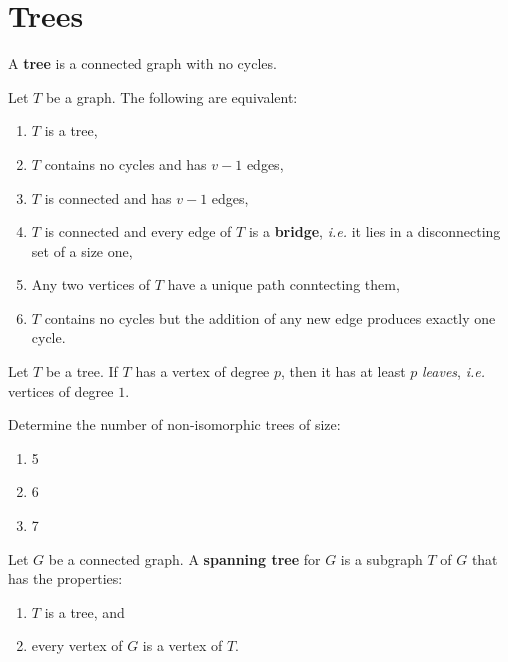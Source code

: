 \section{Trees}\label{sec:trees}

\begin{definition} A \textbf{tree} is a connected graph with no cycles.
\end{definition}

\begin{theorem} Let $T$ be a graph.  The following are equivalent:
\begin{enumerate}
    \item $T$ is a tree,
    \item $T$ contains no cycles and has $v-1$ edges,
    \item $T$ is connected and has $v-1$ edges,
    \item $T$ is connected and every edge of $T$ is a \textbf{bridge}, \textit{i.e.} it lies in a disconnecting set of a size one,
    \item Any two vertices of $T$ have a unique path conntecting them,
    \item $T$ contains no cycles but the addition of any new edge produces exactly one cycle.
\end{enumerate}
\end{theorem}

\begin{theorem} Let $T$ be a tree.  If $T$ has a vertex of degree $p$, then it has at least $p$ \textit{leaves}, \textit{i.e.} vertices of degree $1$.
\end{theorem}

\begin{exercise}Determine the number of non-isomorphic trees of size:
\begin{enumerate}
    \item 5
    \item 6
    \item 7
\end{enumerate}
\end{exercise}

\begin{definition} Let $G$ be a connected graph.  A \textbf{spanning tree} for $G$ is a subgraph $T$ of $G$ that has the properties:
\begin{enumerate}
    \item $T$ is a tree, and
    \item every vertex of $G$ is a vertex of $T$.
\end{enumerate}
\end{definition}

